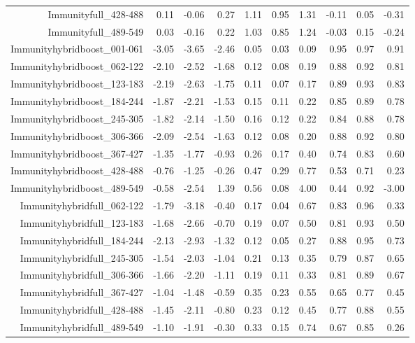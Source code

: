 \begin{table}[ht]
\begin{tabular}{rrrrrrrrrr}
  Immunityfull\_428-488 & 0.11 & -0.06 & 0.27 & 1.11 & 0.95 & 1.31 & -0.11 & 0.05 & -0.31 \\ 
  Immunityfull\_489-549 & 0.03 & -0.16 & 0.22 & 1.03 & 0.85 & 1.24 & -0.03 & 0.15 & -0.24 \\ 
  Immunityhybridboost\_001-061 & -3.05 & -3.65 & -2.46 & 0.05 & 0.03 & 0.09 & 0.95 & 0.97 & 0.91 \\ 
  Immunityhybridboost\_062-122 & -2.10 & -2.52 & -1.68 & 0.12 & 0.08 & 0.19 & 0.88 & 0.92 & 0.81 \\ 
  Immunityhybridboost\_123-183 & -2.19 & -2.63 & -1.75 & 0.11 & 0.07 & 0.17 & 0.89 & 0.93 & 0.83 \\ 
  Immunityhybridboost\_184-244 & -1.87 & -2.21 & -1.53 & 0.15 & 0.11 & 0.22 & 0.85 & 0.89 & 0.78 \\ 
  Immunityhybridboost\_245-305 & -1.82 & -2.14 & -1.50 & 0.16 & 0.12 & 0.22 & 0.84 & 0.88 & 0.78 \\ 
  Immunityhybridboost\_306-366 & -2.09 & -2.54 & -1.63 & 0.12 & 0.08 & 0.20 & 0.88 & 0.92 & 0.80 \\ 
  Immunityhybridboost\_367-427 & -1.35 & -1.77 & -0.93 & 0.26 & 0.17 & 0.40 & 0.74 & 0.83 & 0.60 \\ 
  Immunityhybridboost\_428-488 & -0.76 & -1.25 & -0.26 & 0.47 & 0.29 & 0.77 & 0.53 & 0.71 & 0.23 \\ 
  Immunityhybridboost\_489-549 & -0.58 & -2.54 & 1.39 & 0.56 & 0.08 & 4.00 & 0.44 & 0.92 & -3.00 \\ 
  Immunityhybridfull\_062-122 & -1.79 & -3.18 & -0.40 & 0.17 & 0.04 & 0.67 & 0.83 & 0.96 & 0.33 \\ 
  Immunityhybridfull\_123-183 & -1.68 & -2.66 & -0.70 & 0.19 & 0.07 & 0.50 & 0.81 & 0.93 & 0.50 \\ 
  Immunityhybridfull\_184-244 & -2.13 & -2.93 & -1.32 & 0.12 & 0.05 & 0.27 & 0.88 & 0.95 & 0.73 \\ 
  Immunityhybridfull\_245-305 & -1.54 & -2.03 & -1.04 & 0.21 & 0.13 & 0.35 & 0.79 & 0.87 & 0.65 \\ 
  Immunityhybridfull\_306-366 & -1.66 & -2.20 & -1.11 & 0.19 & 0.11 & 0.33 & 0.81 & 0.89 & 0.67 \\ 
  Immunityhybridfull\_367-427 & -1.04 & -1.48 & -0.59 & 0.35 & 0.23 & 0.55 & 0.65 & 0.77 & 0.45 \\ 
  Immunityhybridfull\_428-488 & -1.45 & -2.11 & -0.80 & 0.23 & 0.12 & 0.45 & 0.77 & 0.88 & 0.55 \\ 
  Immunityhybridfull\_489-549 & -1.10 & -1.91 & -0.30 & 0.33 & 0.15 & 0.74 & 0.67 & 0.85 & 0.26 \\ 

\end{tabular}
\end{table}
